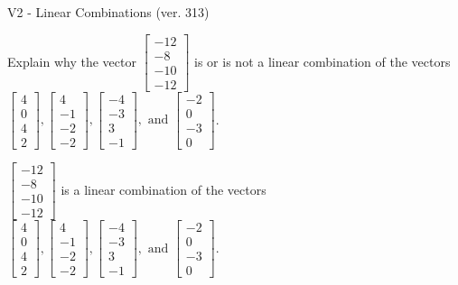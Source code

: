 \begin{exercise}
  \begin{exerciseTitle}V2 - Linear Combinations (ver. 313)\end{exerciseTitle}
  \begin{exerciseStatement}
    Explain why the vector \(\left[\begin{array}{c}
-12 \\
-8 \\
-10 \\
-12
\end{array}\right]\)  is or is not a linear 
	combination of the vectors \(\left[\begin{array}{c}
4 \\
0 \\
4 \\
2
\end{array}\right] , \left[\begin{array}{c}
4 \\
-1 \\
-2 \\
-2
\end{array}\right] , \left[\begin{array}{c}
-4 \\
-3 \\
3 \\
-1
\end{array}\right] , \text{ and } \left[\begin{array}{c}
-2 \\
0 \\
-3 \\
0
\end{array}\right]\).
	


  \end{exerciseStatement}
  \begin{exerciseAnswer}
   \(\left[\begin{array}{c}
-12 \\
-8 \\
-10 \\
-12
\end{array}\right]\) 
  	 is  
	a linear combination of the vectors \(\left[\begin{array}{c}
4 \\
0 \\
4 \\
2
\end{array}\right] , \left[\begin{array}{c}
4 \\
-1 \\
-2 \\
-2
\end{array}\right] , \left[\begin{array}{c}
-4 \\
-3 \\
3 \\
-1
\end{array}\right] , \text{ and } \left[\begin{array}{c}
-2 \\
0 \\
-3 \\
0
\end{array}\right]\).


\end{exerciseAnswer}
\end{exercise}
